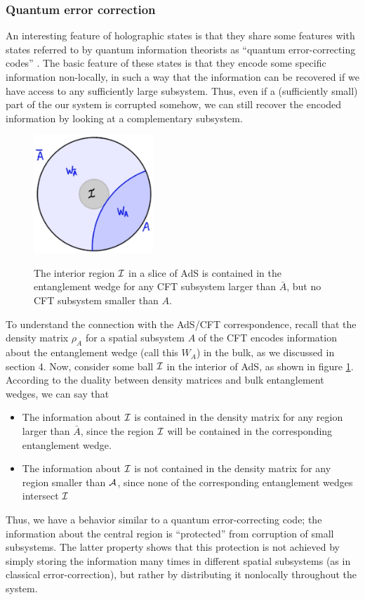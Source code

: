 \documentclass[12pt,epsf]{article}
\begin{document}
\subsubsection*{Quantum error correction}

An interesting feature of holographic states is that they share some features with states referred to by quantum information theorists as ``quantum error-correcting codes'' \cite{Almheiri:2014lwa}.
The basic feature of these states is that they encode some specific information non-locally, in such a way that the information can be recovered if we have access to any sufficiently large subsystem. Thus, even if a (sufficiently small) part of the our system is corrupted somehow, we can still recover the encoded information by looking at a complementary subsystem.

\begin{figure}
\centering
\includegraphics[width=0.4\textwidth]{center.eps}\\
\caption{The interior region ${\cal I}$ in a slice of AdS is contained in the entanglement wedge for any CFT subsystem larger than $\bar{A}$, but no CFT subsystem smaller than $A$.}
\label{center}
\end{figure}

To understand the connection with the AdS/CFT correspondence, recall that the density matrix $\rho_A$ for a spatial subsystem $A$ of the CFT encodes information about the entanglement wedge (call this $W_A$) in the bulk, as we discussed in section 4. Now, consider some ball ${\cal I}$ in the interior of AdS, as shown in figure \ref{center}. According to the duality between density matrices and bulk entanglement wedges, we can say that
\begin{itemize}
\item
The information about ${\cal I}$ is contained in the density matrix for any region larger than $\bar{A}$, since the region ${\cal I}$ will be contained in the corresponding entanglement wedge.
\item
The information about ${\cal I}$ is not contained in the density matrix for any region smaller than ${\cal A}$, since none of the corresponding entanglement wedges intersect ${\cal I}$
\end{itemize}
Thus, we have a behavior similar to a quantum error-correcting code; the information about the central region is ``protected'' from corruption of small subsystems. The latter property shows that this protection is not achieved by simply storing the information many times in different spatial subsystems (as in classical error-correction), but rather by distributing it nonlocally throughout the system.
\end{document}
